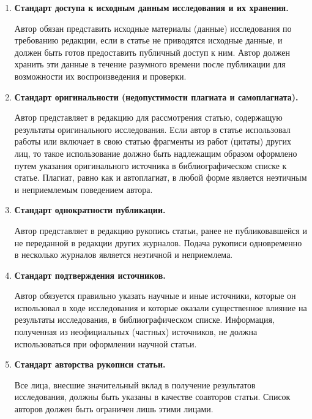 \begin{enumerate}

\item[\bf 2.1.] {\bf Стандарт доступа к исходным данным исследования и их хранения.}

Автор обязан представить исходные материалы (данные) исследования по требованию редакции, если в статье не приводятся исходные данные, и должен быть готов предоставить публичный доступ к ним. Автор должен хранить эти данные в течение разумного времени после публикации для возможности их воспроизведения и проверки.



\item[\bf 2.2.] {\bf Стандарт оригинальности (недопустимости плагиата и самоплагиата).}

Автор представляет в редакцию для рассмотрения статью, содержащую результаты оригинального исследования. Если автор в статье использовал работы или включает в свою статью фрагменты из работ (цитаты) других лиц, то такое использование должно быть надлежащим образом оформлено путем указания оригинального источника в библиографическом списке к статье. Плагиат, равно как и автоплагиат, в любой форме является неэтичным и неприемлемым поведением автора.



\item[\bf 2.3.] {\bf Стандарт однократности публикации.}

Автор представляет в редакцию рукопись статьи, ранее не публиковавшейся и не переданной в редакции других журналов. Подача рукописи одновременно в несколько журналов является неэтичной и неприемлема. %



\item[\bf 2.4.] {\bf  Стандарт подтверждения источников.}

Автор обязуется правильно указать научные и иные источники, которые он использовал в ходе исследования и которые оказали существенное влияние на результаты исследования, в библиографическом списке. Информация, полученная из неофициальных (частных) источников, не должна использоваться при оформлении научной статьи.



\item[\bf 2.5.] {\bf  Стандарт авторства рукописи статьи.}

Все лица, внесшие значительный вклад в получение результатов исследования, должны быть указаны в качестве соавторов статьи. Список авторов должен быть ограничен лишь этими лицами.


\end{enumerate}
